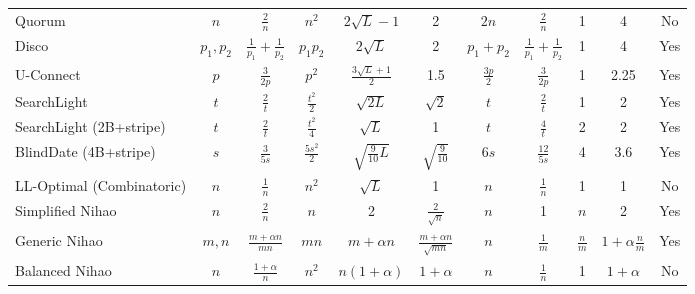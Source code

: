 \documentclass[conference]{IEEEtran}
\begin{document}
\begin{table*}[t]
\begin{tabular}{l|c|cccc|cccc|c}
Quorum                     &  $n$      & $\frac{2}{n}$               &  $n^2$            & $2\sqrt{L}-1$           & 2                             & $2n$           & $\frac{2}{n}$    & 1      & 4   & No \\ 
Disco                      &  $p_1,p_2$&$\frac{1}{p_1}+\frac{1}{p_2}$&  $p_1 p_2$        & $2\sqrt{L}$             & 2                             & $p_1+p_2$      & $\frac{1}{p_1}+\frac{1}{p_2}$    & 1      & 4   & Yes \\ 
U-Connect                  &  $p$      & $\frac{3}{2p}$              &  $p^2$            & $\frac{3\sqrt{L}+1}{2}$ & 1.5                           & $\frac{3p}{2}$ & $\frac{3}{2p}$   & 1      & 2.25& Yes \\
SearchLight                &  $t$      & $\frac{2}{t}$               &  $\frac{t^2}{2}$  & $\sqrt{2L}$             & $\sqrt{2}$                    & $t$            & $\frac{2}{t}$    & 1      & 2   & Yes \\
SearchLight (2B+stripe)    &  $t$      & $\frac{2}{t}$               &  $\frac{t^2}{4}$  & $\sqrt{L}$              & 1                             & $t$            & $\frac{4}{t}$    & 2      & 2   & Yes \\
BlindDate (4B+stripe)      &  $s$      & $\frac{3}{5s}$              &  $\frac{5s^2}{2}$ & $\sqrt{\frac{9}{10}L}$  & $\sqrt{\frac{9}{10}}$         & $6s$           & $\frac{12}{5s}$  & 4      & 3.6 & Yes \\
LL-Optimal (Combinatoric)  &  $n$      & $\frac{1}{n}$               &  $n^2$            & $\sqrt{L}$              & 1                             & $n$            & $\frac{1}{n}$    & 1      & 1   & No \\
Simplified Nihao           &  $n$      & $\frac{2}{n}$               &  $n$              & 2                       & $\frac{2}{\sqrt{n}}$          & $n$            &        1         & $n$    & 2   & Yes \\
Generic Nihao              &  $m,n$    & $\frac{m + \alpha n}{mn}$   &  $mn$             & $m+\alpha n $           & $\frac{m+\alpha n}{\sqrt{mn}}$& $n$            & $\frac{1}{m}$    & $\frac{n}{m}$ & $1+ \alpha \frac{n}{m}$ & Yes \\
Balanced Nihao             &  $n$      & $\frac{1+\alpha}{n}$        &  $n^2$            & $n(1+\alpha)$           & $1+\alpha$                    & $n$            & $\frac{1}{n}$    & 1      & $1+\alpha$ & No \\

\hline
\end{tabular}
\end{table*}
\end{document}

